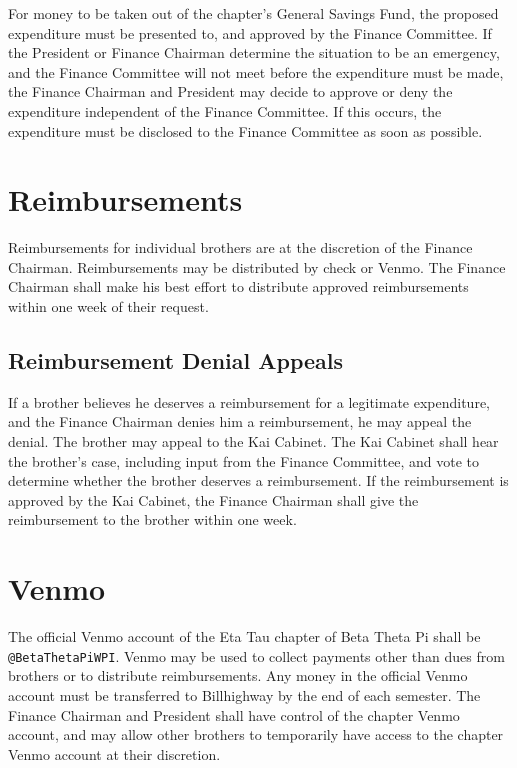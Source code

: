 For money to be taken out of the chapter’s General Savings Fund, the proposed
expenditure must be presented to, and approved by the Finance Committee.
If the President or Finance Chairman determine the situation to be an
emergency, and the Finance Committee will not meet before the expenditure must
be made, the Finance Chairman and President may decide to approve or deny the
expenditure independent of the Finance Committee.
If this occurs, the expenditure must be disclosed to the Finance Committee as
soon as possible.

\section{Reimbursements}

Reimbursements for individual brothers are at the discretion of the Finance
Chairman.
Reimbursements may be distributed by check or Venmo.
The Finance Chairman shall make his best effort to distribute approved
reimbursements within one week of their request.

\subsection{Reimbursement Denial Appeals}

If a brother believes he deserves a reimbursement for a legitimate expenditure,
and the Finance Chairman denies him a reimbursement, he may appeal the denial.
The brother may appeal to the Kai Cabinet.
The Kai Cabinet shall hear the brother’s case, including input from the Finance
Committee, and vote to determine whether the brother deserves a reimbursement.
If the reimbursement is approved by the Kai Cabinet, the Finance Chairman shall
give the reimbursement to the brother within one week.

\section{Venmo}

The official Venmo account of the Eta Tau chapter of Beta Theta Pi shall be
\texttt{@BetaThetaPiWPI}.
Venmo may be used to collect payments other than dues from brothers or to
distribute reimbursements.
Any money in the official Venmo account must be transferred to Billhighway by
the end of each semester.
The Finance Chairman and President shall have control of the chapter Venmo
account, and may allow other brothers to temporarily have access to the chapter
Venmo account at their discretion.


